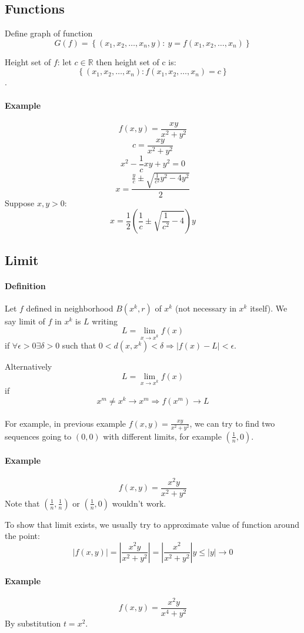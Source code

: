 \subsection{Functions}
Define graph of function $$G(f) = \left\{ \left(x_1,x_2,\dots, x_n,y\right): \: y = f\left(x_1,x_2,\dots, x_n\right)  \right\}$$

Height set of $f$: let $c \in\mathbb{R}$ then height set of c is: $$\left\{ \left(x_1,x_2,\dots, x_n\right)  : f\left(x_1,x_2,\dots, x_n\right)  = c  \right\}$$.
\paragraph{Example}
$$f(x,y) = \frac{xy}{x^2+y^2}$$
$$c = \frac{xy}{x^2+y^2}$$
$$x^2-\frac{1}{c}xy+y^2 = 0$$
$$x = \frac{\frac{y}{c}\pm \sqrt{\frac{1}{c^2}y^2-4y^2}}{2}$$
Suppose $x,y>0$:
$$x = \frac{1}{2}\left(\frac{1}{c}\pm \sqrt{\frac{1}{c^2}-4}\right)y$$
\subsection{Limit}
\paragraph{Definition} Let $f$ defined in neighborhood $B(x^k,r)$ of $x^k$ (not necessary in $x^k$ itself).   We say limit of $f$ in $x^k$ is $L$ writing 
$$L = \lim_{x\to x^k} f(x)$$
if $\forall \epsilon > 0 \exists \delta > 0$ such that $0<d(x,x^k)<\delta \Rightarrow \left|f(x)  - L\right|< \epsilon$.

Alternatively $$L = \lim_{x\to x^k} f(x)$$
if $$x^m \neq x^k \to x^m \Rightarrow f(x^m) \to L$$

\paragraph{} For example, in previous example $f(x,y) = \frac{xy}{x^2+y^2}$, we can try to find two sequences going to $(0,0)$ with different limits, for example $\left(\frac{1}{n},0\right)$.

\paragraph{Example} 
$$f(x,y) = \frac{x^2y}{x^2+y^2}$$ Note that $\left(\frac{1}{n},\frac{1}{n}\right)$ or $\left(\frac{1}{n},0\right)$ wouldn't work.

To show that limit exists, we usually try to approximate value of function around the point:$$\left|f(x,y)\right| = \left| \frac{x^2y}{x^2+y^2} \right| = \left| \frac{x^2}{x^2+y^2} \right|y \leq \left|y\right|\to 0$$
\paragraph{Example}
$$f(x,y) = \frac{x^2y}{x^4+y^2}$$
By substitution $t=x^2$.